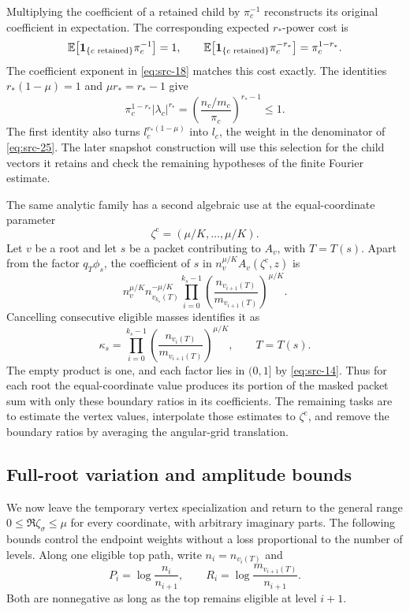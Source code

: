Multiplying the coefficient of a retained child by $\pi_c^{-1}$ reconstructs its original
coefficient in expectation.  The corresponding expected $r_*$-power
cost is
\[
 \mathbb E\!\left[\mathbf 1_{\{c\text{ retained}\}}\pi_c^{-1}\right]=1,
 \qquad
 \mathbb E\!\left[\mathbf 1_{\{c\text{ retained}\}}\pi_c^{-r_*}\right]
       =\pi_c^{1-r_*}.
\]
The coefficient exponent in \eqref{eq:src-18} matches this cost
exactly.  The identities $r_*(1-\mu)=1$ and $\mu r_*=r_*-1$ give
\begin{equation}
 \pi_c^{1-r_*}|\lambda_c|^{r_*}
   =\left(\frac{n_c/m_c}{\pi_c}\right)^{r_*-1}\le1.
 \label{hier:selection-cancellation}
\end{equation}
The first identity also turns $l_c^{r_*(1-\mu)}$ into $l_c$, the weight
in the denominator of \eqref{eq:src-25}.  The later snapshot construction
will use this selection for the child vectors it retains and check the
remaining hypotheses of the finite Fourier estimate.

The same analytic family has a second algebraic use at the equal-coordinate
parameter
\[
 \zeta^{\mathrm c}=(\mu/K,\ldots,\mu/K).
\]
Let $v$ be a root and let $s$ be a packet contributing to $A_v$, with
$T=T(s)$.  Apart from the factor $q_T\phi_s$, the coefficient of $s$ in
$n_v^{\mu/K}A_v(\zeta^{\mathrm c},z)$ is
\[
 n_v^{\mu/K}n_{v_{k_s}(T)}^{-\mu/K}
       \prod_{i=0}^{k_s-1}
        \left(\frac{n_{v_{i+1}(T)}}{m_{v_{i+1}(T)}}\right)^{\mu/K}.
\]
Cancelling consecutive eligible masses identifies it as
\begin{equation}\label{eq:src-30}
 \kappa_s
   =\prod_{i=0}^{k_s-1}
       \left(\frac{n_{v_i(T)}}{m_{v_{i+1}(T)}}\right)^{\mu/K},
 \qquad T=T(s).
\end{equation}
The empty product is one, and each factor lies in $(0,1]$ by
\eqref{eq:src-14}.  Thus for each root the equal-coordinate value produces
its portion of the masked packet sum with only these boundary ratios in
its coefficients.  The
remaining tasks are to estimate the vertex values, interpolate those
estimates to $\zeta^{\mathrm c}$, and remove the boundary ratios by
averaging the angular-grid translation.

\subsection{Full-root variation and amplitude bounds}

We now leave the temporary vertex specialization and return to the general
range $0\le\Re\zeta_\sigma\le\mu$ for every coordinate, with arbitrary
imaginary parts.  The following bounds control the endpoint weights
without a loss proportional to the number of levels.  Along one eligible
top path, write $n_i=n_{v_i(T)}$ and
\begin{equation}
 P_i=\log\frac{n_i}{n_{i+1}},
 \qquad
 R_i=\log\frac{m_{v_{i+1}(T)}}{n_{i+1}}.
 \label{hier:positive-logs}
\end{equation}
Both are nonnegative as long as the top remains eligible at level $i+1$.

